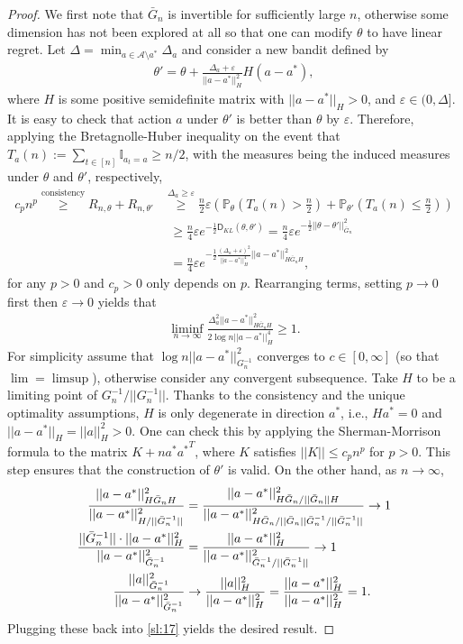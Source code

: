 \documentclass[10pt,a4article]{amsart}
\numberwithin{equation}{section}
\theoremstyle{plain}
\theoremstyle{definition}
\def\P{{\mathbb P}}
\def\e{{\varepsilon}}
\def\t{{\theta}}
\begin{document}
\begin{proof}
We first note that $\bar{G}_n$ is invertible for sufficiently large $n$, otherwise some dimension has not been explored at all so that one can modify $\t$ to have linear regret. Let $\Delta = \min_{a\in\mathcal A\setminus a^*}\Delta_a$ and consider a new bandit defined by 
\begin{align*}
\t' = \t + \frac{\Delta_a + \e}{||a-a^*||^2_H}H(a-a^*),
\end{align*}
where $H$ is some positive semidefinite matrix with $||a-a^*||_H>0$, and $\e\in (0, \Delta]$. It is easy to check that action $a$ under $\t'$ is better than $\t$ by $\e$. Therefore, applying the Bretagnolle-Huber inequality on the event that $T_a(n):=\sum_{t\in [n]}\mathbb I_{a_t = a}\geq n/2$, with the measures being the induced measures under $\t$ and $\t'$, respectively, 
\begin{align*}
c_p n^p\stackrel{\text{consistency}}{\geq} R_{n, \t}+R_{n, \t'} &\stackrel{\Delta_a\geq\e}{\geq}\frac{n}{2}\e\left(\P_\t\left(T_a(n)>\frac{n}{2}\right)+\P_{\t'}\left(T_a(n)\leq\frac{n}{2}\right)\right)\\
&\ \ \geq \frac{n}{4}\e e^{-\frac{1}{2}\mathsf D_{KL}(\t, \t')} =  \frac{n}{4}\e e^{-\frac{1}{2}||\t-\t'||^2_{\bar{G}_n}}\\
&\ \ =\frac{n}{4}\e e^{-\frac{1}{2}\frac{(\Delta_a+\e)^2}{||a-a^*||_H^4}||a-a^*||^2_{H\bar{G}_nH}},
\end{align*}
for any $p>0$ and $c_p>0$ only depends on $p$. 
Rearranging terms, setting $p\to 0$ first then $\e\to 0$ yields that
\begin{align}
\liminf_{n\to\infty}\frac{\Delta_a^2 ||a-a^*||^2_{H\bar{G}_nH}}{2\log n||a-a^*||_H^4}\geq 1. \label{sl:17}
\end{align}
For simplicity assume that $\log n ||a-a^*||_{G_n^{-1}}^2$ converges to $c\in [0, \infty]$ (so that $\lim =\limsup$), otherwise consider any convergent subsequence.  Take $H$ to be a limiting point of $G_n^{-1}/||G^{-1}_n||$. Thanks to the consistency and the unique optimality assumptions, $H$ is only degenerate in direction $a^*$, i.e., $Ha^*=0$ and $||a-a^*||_H = ||a||^2_H>0$.  One can check this by applying the Sherman-Morrison formula to the matrix $K+n a^*{a^*}^T$, where $K$ satisfies $||K||\leq c_pn^p$ for $p>0$. This step ensures that the construction of $\t'$ is valid. On the other hand, as $n\to\infty$,
\begin{align*}
\frac{||a-a^*||^2_{H\bar{G}_nH}}{||a-a^*||^2_{H/||\bar{G}^{-1}_n||}} & = \frac{||a-a^*||^2_{\textcolor{black}{H\bar{G}_n/||\bar{G}_n||}H}}{||a-a^*||^2_{\textcolor{black}{H\bar{G}_n/||\bar{G}_n||}\bar{G}^{-1}_n/||\bar{G}^{-1}_n||}}\to 1\\
\frac{||\bar{G}^{-1}_n||\cdot ||a-a^*||^2_{H}}{||a-a^*||^2_{\bar{G}^{-1}_n}} &= \frac{||a-a^*||^2_{H}}{||a-a^*||^2_{\bar{G}^{-1}_n/||\bar{G}^{-1}_n||}}\to 1\\
\frac{||a||^2_{\bar{G}_n^{-1}}}{||a-a^*||^2_{\bar{G}_n^{-1}}}&\to\frac{||a||^2_{H}}{||a-a^*||^2_{H}} = \frac{||a-a^*||^2_{H}}{||a-a^*||^2_{H}}=1.
\end{align*}
Plugging these back into \eqref{sl:17} yields the desired result. 
\end{proof}
\end{document}
